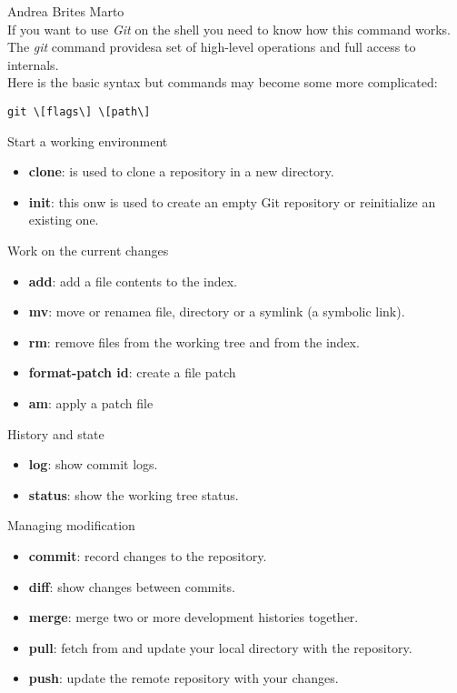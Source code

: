 \documentclass[hidelinks,12pt,a4paper,numbers=enddot]{scrartcl}
\begin{document}
\large Andrea Brites Marto \normalsize\\


If you want to use \emph{Git} on the shell you need to know how this command works.\\
The \emph{git} command providesa set of high-level operations and full access to internals.\\

Here is the basic syntax but commands may become some more complicated:

\begin{verbatim}
git \[flags\] \[path\]
\end{verbatim}

Start a working environment

\begin{itemize}
    \item \textbf{clone}: is used to clone a repository in a new directory.
    \item \textbf{init}: this onw is used to create an empty Git repository or reinitialize
        an existing one.
    
\end{itemize}

Work on the current changes
\begin{itemize}
    \item \textbf{add}: add a file contents to the index.
    \item \textbf{mv}: move or renamea file, directory or a symlink (a symbolic link).
    \item \textbf{rm}: remove files from the working tree and from the index.
    \item \textbf{format-patch id}: create a file patch
    \item \textbf{am}: apply a patch file
\end{itemize}

History and state
\begin{itemize}
    \item \textbf{log}: show commit logs.
    \item \textbf{status}: show the working tree status.
\end{itemize}

Managing modification
\begin{itemize}
    \item \textbf{commit}: record changes to the repository.
    \item \textbf{diff}: show changes between commits.
    \item \textbf{merge}: merge two or more development histories together.
    \item \textbf{pull}: fetch from and update your local directory with the repository.
    \item \textbf{push}: update the remote repository with your changes.
\end{itemize}
\end{document}
